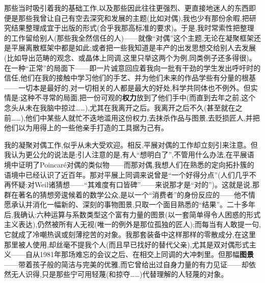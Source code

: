 那些当时吸引着我的基础工作,以及那些因此往往更强烈、更直接地迷人的东西即便是那些我曾让自己有空去深究和发展的主题(比如对偶),我也少有那份余暇,把研究结果整理成宜于出版的形式(合乎我那高标准的要求)。于是,我时常索性把整理的工作留给别人(那些我全然信任的人)——就像“对偶”这个主题,无论在凝聚框架还是平展离散框架中都是如此;或者把一些我知道是丰产的出发思想交给别人去发展(比如导出范畴的观念、或晶体上同调,这里只举这两个为例,同类例子还多得很)。在一种“正常”的局面下——即一片诚意回应着我向一批有干劲的学生发出呼吁时的信任,他们在我的接触中学习他们的手艺、并为他们未来的作品学些有分量的根基——一切本是最好的\dmark{},对一切相关的人都是最大的好处,科学共同体也不例外。但实情是:这种不寻常的局面,把一份可观的\textbf{权力}放到了他们手中(而直到去年之前,这个念头从未在我脑中掠过……),尤其在我离开之后。我离开之后不久(甚至就在之前……),他们中某些人就忙不迭地滥用这份权力,去抹杀作品与图景,去贬损匠人,并把他们以为用得上的一些他亲手打造的工具据为己有。

我的凝聚对偶工作,似乎从未大受欢迎。相反,平展对偶的工作却立刻引来注意。但我认为更公允的说法是:引人注意的是,有人“想明白了”,不管用什么办法,在平展语境中证明了Poincaré对偶的类似物——而那对偶,我想人们在熟悉的定向拓扑簇的语境中已经认识了近百年。那对平展上同调来说曾是“一个好得分点”(人们几乎不再怀疑:对Weil诸猜想——“其难度有口皆碑”——来说那才是“对的”)。这就是说,那群在著名的猜想旁逡候着的数学公众,是以一个“消费者”的身份反应的——他不情愿承认并消化一幅新的、深刻的事物图景,只取一个面目熟悉的“结果”。二十多年后,我确认:六种运算与系数类型这个富有力量的图景(以一套简单得令人困惑的形式主义表达),仍然被所有人无视(唯一的例外是那位孤独的匠人);而每当有人敢提一句,它就成了冷嘲热讽或刻薄挖苦的对象。我那套装备中这样那样的零散成分,在这里那里被人使用,却丝毫不提我个人(而且早已找好的替代父亲),尤其是双对偶形式主义——自从1981年那场难忘的会议之后、在相交上同调的大冲刺里。但那幅\dmark{}\textbf{图景}——带着孩子般的简洁与完美的优雅,而它曾给出过自身力量的有力见证——却依然无人识得,只是那些宁可用轻蔑(和掠夺……)代替理解的人轻蔑的对象。

